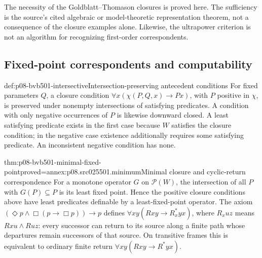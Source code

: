 The necessity of the Goldblatt--Thomason closures is proved here.
The sufficiency is the source's cited algebraic or model-theoretic
representation theorem, not a consequence of the closure examples alone.
Likewise, the ultrapower criterion is not an algorithm for recognizing
first-order correspondents.

\subsection{Fixed-point correspondents and computability}
\label{sec:p08-bvb501-fixed-correspondence}

\begin{hbdefinition}{def:p08-bvb501-intersective}{Intersection-preserving antecedent conditions}
For fixed parameters \(Q\), a closure condition
\(\forall x(\chi(P,Q,x)\to Px)\), with \(P\) positive
in \(\chi\), is preserved under nonempty intersections of
satisfying predicates. A condition with only negative occurrences of
\(P\) is likewise downward closed. A least satisfying predicate
exists in the first case because \(W\) satisfies the closure condition;
in the negative case existence additionally requires some satisfying
predicate. An inconsistent negative condition has none.
\end{hbdefinition}

\begin{hbtheorem}{thm:p08-bvb501-minimal-fixed-point}{proved=annex:p08.src025501.minimum}{Minimal closure and cyclic-return correspondence}
For a monotone operator \(G\) on \(\mathcal P(W)\), the
intersection of all \(P\) with \(G(P)\subseteq P\) is its
least fixed point. Hence the positive closure conditions above have
least predicates definable by a least-fixed-point operator. The axiom
\((\Diamond p\land\Box(p\to\Box p))\to p\) defines
\(\forall xy(Rxy\to R_x^*yx)\), where
\(R_xuz\) means \(Rxu\land Ruz\): every successor can return
to its source along a finite path whose departures remain successors
of that source. On transitive frames this is equivalent to ordinary
finite return \(\forall xy(Rxy\to R^*yx)\).
\end{hbtheorem}

